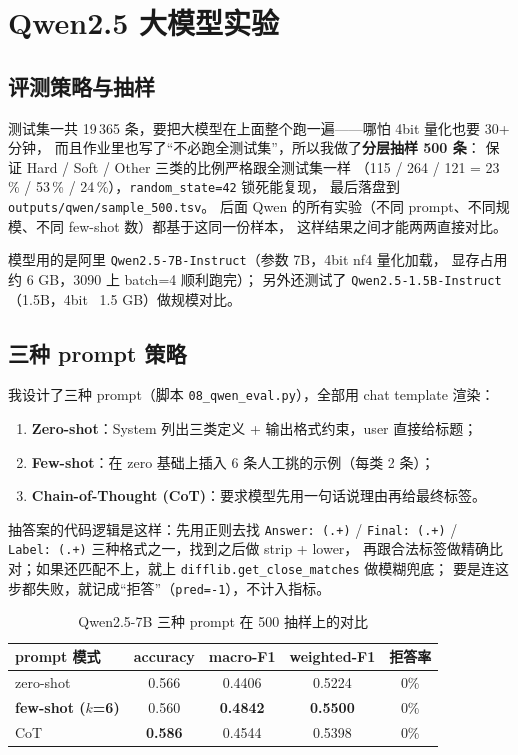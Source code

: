 \documentclass{SYSUReport}
\begin{document}
\section{Qwen2.5 大模型实验}

\subsection{评测策略与抽样}

测试集一共 19\,365 条，要把大模型在上面整个跑一遍——哪怕 4bit 量化也要 30+ 分钟，
而且作业里也写了“不必跑全测试集”，所以我做了\textbf{分层抽样 500 条}：
保证 Hard / Soft / Other 三类的比例严格跟全测试集一样
（115 / 264 / 121 = 23\,\% / 53\,\% / 24\,\%），\texttt{random\_state=42} 锁死能复现，
最后落盘到 \texttt{outputs/qwen/sample\_500.tsv}。
后面 Qwen 的所有实验（不同 prompt、不同规模、不同 few-shot 数）都基于这同一份样本，
这样结果之间才能两两直接对比。

模型用的是阿里 \texttt{Qwen2.5-7B-Instruct}（参数 7B，4bit nf4 量化加载，
显存占用约 6 GB，3090 上 batch=4 顺利跑完）；
另外还测试了 \texttt{Qwen2.5-1.5B-Instruct}（1.5B，4bit ~1.5 GB）做规模对比。

\subsection{三种 prompt 策略}

我设计了三种 prompt（脚本 \verb|08_qwen_eval.py|），全部用 chat template 渲染：

\begin{enumerate}
    \item \textbf{Zero-shot}：System 列出三类定义 + 输出格式约束，user 直接给标题；
    \item \textbf{Few-shot}：在 zero 基础上插入 6 条人工挑的示例（每类 2 条）；
    \item \textbf{Chain-of-Thought (CoT)}：要求模型先用一句话说理由再给最终标签。
\end{enumerate}

抽答案的代码逻辑是这样：先用正则去找 \texttt{Answer:\,(.+)} / \texttt{Final:\,(.+)}
/ \texttt{Label:\,(.+)} 三种格式之一，找到之后做 strip + lower，
再跟合法标签做精确比对；如果还匹配不上，就上 \texttt{difflib.get\_close\_matches} 做模糊兜底；
要是连这步都失败，就记成“拒答”（\texttt{pred=-1}），不计入指标。

\begin{table}[!htbp]
\centering
\caption{Qwen2.5-7B 三种 prompt 在 500 抽样上的对比}
\label{tab:qwen-prompt}
\begin{tabular}{lcccc}
\toprule
prompt 模式 & accuracy & macro-F1 & weighted-F1 & 拒答率 \\
\midrule
zero-shot       & 0.566 & 0.4406 & 0.5224 & 0\% \\
\textbf{few-shot ($k$=6)} & 0.560 & \textbf{0.4842} & \textbf{0.5500} & 0\% \\
CoT             & \textbf{0.586} & 0.4544 & 0.5398 & 0\% \\
\bottomrule
\end{tabular}
\end{table}
\end{document}
